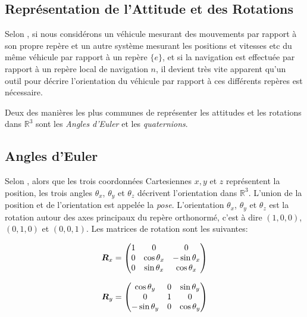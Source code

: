 \documentclass[12pt,a4paper]{report}
\begin{document}
\begin{appendix}
	\chapter{Représentation de l'Attitude et des Rotations}
	\label{app:a}
	Selon \cite{gustavsson_uav_2015}, si nous considérons un véhicule mesurant des mouvements par rapport à son propre repère et un autre système mesurant les positions et vitesses etc du même véhicule par rapport à un repère $\{e\}$, et si la navigation est effectuée par rapport à un repère local de navigation ${n}$, il devient très vite apparent qu'un outil pour décrire l'orientation du véhicule par rapport à ces différents repères est nécessaire.
	
	\para Deux des manières les plus communes de représenter les attitudes et les rotations dans $\mathbb{R}^3$ sont les \textit{Angles d'Euler} et les \textit{quaternions}.
		\section{Angles d'Euler}
		Selon \cite{nuchter_3d_2009}, alors que les trois coordonnées Cartesiennes $x,y$ et $z$ représentent la position, les trois angles $\theta_x$, $\theta_y$ et $\theta_z$ décrivent l'orientation dans $\mathbb{R}^3$. L'union de la position et de l'orientation est appelée la \textit{pose}. L'orientation $\theta_x$, $\theta_y$ et $\theta_z$ est la rotation autour des axes principaux du repère orthonormé, c'est à dire $(1,0,0)$, $(0,1,0)$ et $(0,0,1)$. Les matrices de rotation sont les suivantes:
		
		\begin{equation*}
		\boldsymbol{R}_x =	\begin{pmatrix}
		1 & 0 & 0 \\
		0 & \cos{\theta_x} & -\sin{\theta_x}\\
		0 & \sin{\theta_x} & \cos{\theta_x}
		
		\end{pmatrix}
		\end{equation*}
		
		\begin{equation*}
		\boldsymbol{R}_y = \begin{pmatrix}
		\cos{\theta_y} & 0 & \sin{\theta_y}\\
		0 & 1 & 0 \\
		-\sin{\theta_y} &  0 & \cos{\theta_y}
		\end{pmatrix}
		\end{equation*}
		

\end{appendix}
\end{document}
